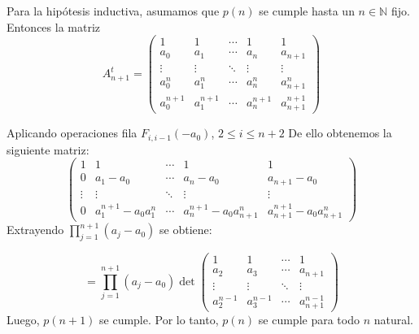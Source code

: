 \begin{frame}
\begin{solution}
		Para la hipótesis inductiva, asumamos que $p\left(n\right)$ se
		cumple hasta un $n\in\mathbb{N}$ fijo.
        Entonces la matriz $$A^{t}_{n+1}=\begin{pmatrix} 1&1&\cdots & 1 &1\\a_0&a_1&\cdots &a_{n}&a_{n+1}\\\vdots&\vdots&\ddots&\vdots&\vdots\\a_0^{n}&a_1^{n}&\cdots&a_{n}^{n}& a_{n+1}^{n}\\a_0^{n+1}&a_1^{n+1}&\cdots&a_{n}^{n+1}&a_{n+1}^{n+1}\end{pmatrix}$$
        \end{solution}
    \end{frame}
    \begin{frame}
    Aplicando operaciones fila $F_{i,i-1}(-a_{0})$, $2\leq i\leq n+2$
     De ello obtenemos la siguiente matriz:
     $$\begin{pmatrix} 1&1&\cdots & 1 &1\\   0&a_1-a_0&\cdots &a_n-a_0&a_{n+1}-a_0\\   \vdots&\vdots&\ddots&\vdots&\vdots\\   0&a_1^{n+1}-a_0a_{1}^{n}&\cdots&a_{n}^{n+1}-a_0a_{n+1}^{n}& a_{n+1}^{n+1}-a_0a_{n+1}^{n}\end{pmatrix}$$
    Extrayendo $\prod_{j=1}^{n+1}(a_j-a_0)$ se obtiene:
    
    $$=\prod_{j=1}^{n+1}(a_j-a_0) \det\begin{pmatrix} 1& 1&\cdots&1\\a_2&a_3&\cdots&a_{n+1}\\ \vdots&\vdots&\ddots&\vdots\\a_2^{n-1}&a_3^{n-1}&\cdots&a_{n+1}^{n-1}\end{pmatrix}$$
		Luego, $p\left(n+1\right)$ se cumple.
		Por lo tanto, $p\left(n\right)$ se cumple para todo $n$ natural.
	
\end{frame}

